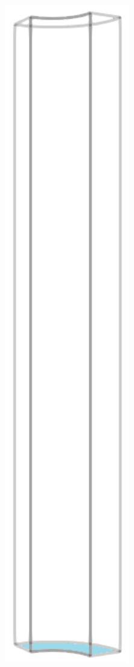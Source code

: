 \begin{figure}[!htb]
\begin{subfigure}[b]{0.16\textwidth}
    \includegraphics[width=0.6\textwidth]{Chapter5/figures/spallation/geometry_bottom}

\end{subfigure}
\end{figure}

